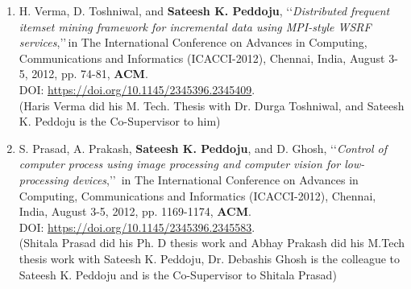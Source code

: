 \begin{enumerate}
	\item
	H. Verma, D. Toshniwal, and  \textbf{Sateesh K. Peddoju}, \lq\lq \textit{Distributed frequent itemset mining framework for incremental data using MPI-style WSRF services},\rq\rq\,in The International Conference on Advances in Computing, Communications and Informatics (ICACCI-2012), Chennai, India, August 3-5, 2012, pp. 74-81, \textbf{ACM}. \\DOI: \url{https://doi.org/10.1145/2345396.2345409}. \\(Haris Verma did his M. Tech. Thesis with Dr. Durga Toshniwal, and Sateesh K. Peddoju is the Co-Supervisor to him)

	
	\item
	S. Prasad, A. Prakash, \textbf{Sateesh K. Peddoju}, and D. Ghosh, \lq\lq \textit{Control of computer process using image processing and computer vision for low-processing devices},\rq\rq\, in The International Conference on Advances in Computing, Communications and Informatics (ICACCI-2012), Chennai, India, August 3-5, 2012, pp. 1169-1174, \textbf{ACM}. \\DOI: \url{https://doi.org/10.1145/2345396.2345583}. \\(Shitala Prasad did his Ph. D thesis work and Abhay Prakash did his M.Tech thesis work with Sateesh K. Peddoju, Dr. Debashis Ghosh is the colleague to Sateesh K. Peddoju and is the Co-Supervisor to Shitala Prasad)
	
	\end{enumerate}